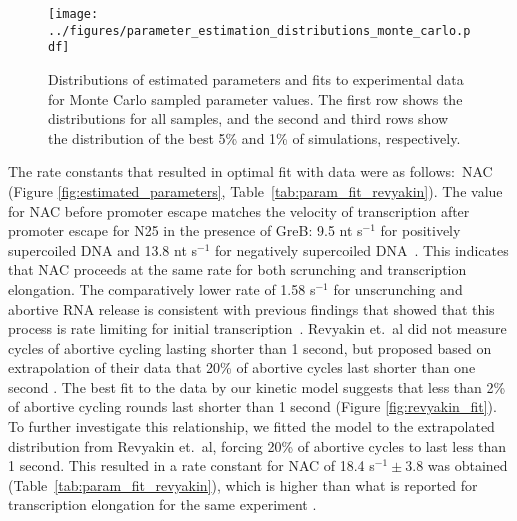 
\begin{figure}
	\begin{center}
      \texttt{[image: ../figures/parameter\_estimation\_distributions\_monte\_carlo.pdf]}
	\end{center}
    \caption{Distributions of estimated parameters and fits to experimental
      data for Monte Carlo sampled parameter values.  The first row shows the
      distributions for all samples, and the second and third rows show the
      distribution of the best 5\% and 1\% of simulations, respectively.}
      \label{fig:parameter_estimation_1}
\end{figure}


The rate constants that resulted in optimal fit with data were as follows:~NAC
(Figure \ref{fig:estimated_parameters},
Table~\ref{tab:param_fit_revyakin}). The value for NAC before promoter escape
matches the velocity of transcription after promoter escape for N25 in the
presence of GreB: 9.5 nt s$^{-1}$ for positively supercoiled DNA and 13.8 nt
s$^{-1}$ for negatively supercoiled DNA~\cite{revyakin_abortive_2006}. This
indicates that NAC proceeds at the same rate for both scrunching and
transcription elongation. The comparatively lower rate of 1.58 s$^{-1}$ for
unscrunching and abortive RNA release is consistent with previous findings
that showed that this process is rate limiting for initial
transcription~\cite{margeat_direct_2006, revyakin_abortive_2006}. Revyakin
et.\ al did not measure cycles of abortive cycling lasting shorter than 1
second, but proposed based on extrapolation of their data that 20\% of
abortive cycles last shorter than one second \cite{revyakin_abortive_2006}.
The best fit to the data by our kinetic model suggests that less than 2\% of
abortive cycling rounds last shorter than 1 second (Figure
\ref{fig:revyakin_fit}). To further investigate this relationship, we fitted
the model to the extrapolated distribution from Revyakin et.\ al, forcing 20\%
of abortive cycles to last less than 1 second.  This resulted in a rate
constant for NAC of 18.4 s$^{-1} \pm 3.8$ was obtained
(Table~\ref{tab:param_fit_revyakin}), which is higher than what is reported
for transcription elongation for the same experiment
\cite{revyakin_abortive_2006}.

